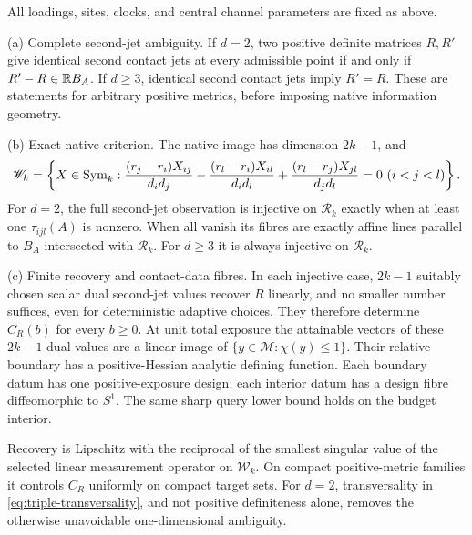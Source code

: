 \begin{theorem}\label{thm:general-tomography}
All loadings, sites, clocks, and central channel parameters are fixed as above.

\smallskip\noindent\textup{(a) Complete second-jet ambiguity.}
If $d=2$, two positive definite matrices $R,R'$ give identical second contact jets at every admissible point if and only if $R'-R\in\mathbb R B_A$. If $d\ge3$, identical second contact jets imply $R'=R$. These are statements for arbitrary positive metrics, before imposing native information geometry.

\smallskip\noindent\textup{(b) Exact native criterion.}
The native image has dimension $2k-1$, and
\begin{equation}\label{eq:all-hankel-relations}
 \mathscr W_k=\left\{X\in\operatorname{Sym}_k:
 \frac{(r_j-r_i)X_{ij}}{d_i d_j}
 -\frac{(r_l-r_i)X_{il}}{d_i d_l}
 +\frac{(r_l-r_j)X_{jl}}{d_j d_l}=0\ (i<j<l)\right\}.
\end{equation}
For $d=2$, the full second-jet observation is injective on $\mathscr R_k$ exactly when at least one $\tau_{ijl}(A)$ is nonzero. When all vanish its fibres are exactly affine lines parallel to $B_A$ intersected with $\mathscr R_k$. For $d\ge3$ it is always injective on $\mathscr R_k$.

\smallskip\noindent\textup{(c) Finite recovery and contact-data fibres.}
In each injective case, $2k-1$ suitably chosen scalar dual second-jet values recover $R$ linearly, and no smaller number suffices, even for deterministic adaptive choices. They therefore determine $C_R(b)$ for every $b\ge0$. At unit total exposure the attainable vectors of these $2k-1$ dual values are a linear image of $\{y\in\mathscr M:\chi(y)\le1\}$. Their relative boundary has a positive-Hessian analytic defining function. Each boundary datum has one positive-exposure design; each interior datum has a design fibre diffeomorphic to $S^1$. The same sharp query lower bound holds on the budget interior.

Recovery is Lipschitz with the reciprocal of the smallest singular value of the selected linear measurement operator on $\mathscr W_k$. On compact positive-metric families it controls $C_R$ uniformly on compact target sets. For $d=2$, transversality in \eqref{eq:triple-transversality}, and not positive definiteness alone, removes the otherwise unavoidable one-dimensional ambiguity.
\end{theorem}

